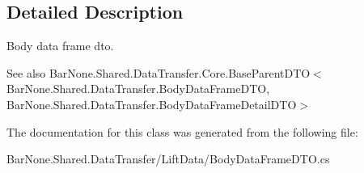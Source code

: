 \subsection{Detailed Description}
Body data frame dto. 

\begin{DoxySeeAlso}{See also}
Bar\+None.\+Shared.\+Data\+Transfer.\+Core.\+Base\+Parent\+D\+T\+O$<$\+Bar\+None.\+Shared.\+Data\+Transfer.\+Body\+Data\+Frame\+D\+T\+O, Bar\+None.\+Shared.\+Data\+Transfer.\+Body\+Data\+Frame\+Detail\+D\+T\+O$>$


\end{DoxySeeAlso}


The documentation for this class was generated from the following file\+:\begin{DoxyCompactItemize}
\item 
Bar\+None.\+Shared.\+Data\+Transfer/\+Lift\+Data/Body\+Data\+Frame\+D\+T\+O.\+cs\end{DoxyCompactItemize}
